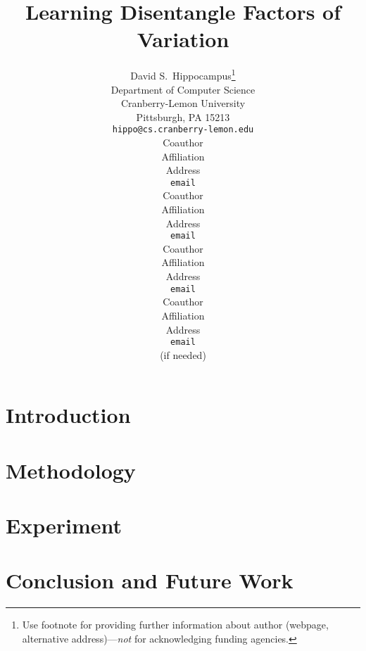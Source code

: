 \documentclass{article} %
\title{Learning Disentangle Factors of Variation}
\author{
David S.~Hippocampus\thanks{ Use footnote for providing further information
about author (webpage, alternative address)---\emph{not} for acknowledging
funding agencies.} \\
Department of Computer Science\\
Cranberry-Lemon University\\
Pittsburgh, PA 15213 \\
\texttt{hippo@cs.cranberry-lemon.edu} \\
\And
Coauthor \\
Affiliation \\
Address \\
\texttt{email} \\
\ANDp
Coauthor \\
Affiliation \\
Address \\
\texttt{email} \\
\And
Coauthor \\
Affiliation \\
Address \\
\texttt{email} \\
\And
Coauthor \\
Affiliation \\
Address \\
\texttt{email} \\
(if needed)\\
}
\begin{document}
\maketitle
\begin{abstract}

\end{abstract}
\section{Introduction}


\section{Methodology}


\section{Experiment}


\section{Conclusion and Future Work}


\clearpage


\end{document}

